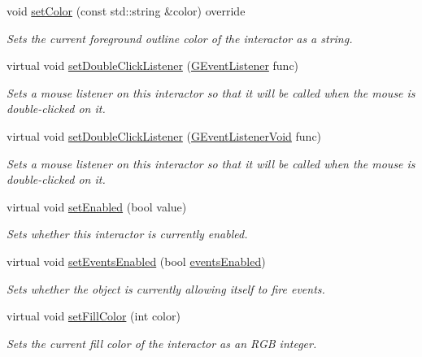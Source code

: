 \begin{DoxyCompactItemize}
void \mbox{\hyperlink{classsgl_1_1GCanvas_a56845b1accc47aa881d05939eef6996c}{set\+Color}} (const std\+::string \&color) override
\begin{DoxyCompactList}\small\item\em Sets the current foreground outline color of the interactor as a string. \end{DoxyCompactList}\item 
virtual void \mbox{\hyperlink{classsgl_1_1GInteractor_ac29f9a3462458e165fae3a1f046ee77a}{set\+Double\+Click\+Listener}} (\mbox{\hyperlink{namespacesgl_ae9f3e9eab70035da1a2b114e21357b25}{G\+Event\+Listener}} func)
\begin{DoxyCompactList}\small\item\em Sets a mouse listener on this interactor so that it will be called when the mouse is double-\/clicked on it. \end{DoxyCompactList}\item 
virtual void \mbox{\hyperlink{classsgl_1_1GInteractor_a50096194d66f48c92dd4c512d41bfc76}{set\+Double\+Click\+Listener}} (\mbox{\hyperlink{namespacesgl_a54427ce97bb1c2804e4fe2b0a62e8b17}{G\+Event\+Listener\+Void}} func)
\begin{DoxyCompactList}\small\item\em Sets a mouse listener on this interactor so that it will be called when the mouse is double-\/clicked on it. \end{DoxyCompactList}\item 
virtual void \mbox{\hyperlink{classsgl_1_1GInteractor_ab831367dd84bbd579e02e55bacb21343}{set\+Enabled}} (bool value)
\begin{DoxyCompactList}\small\item\em Sets whether this interactor is currently enabled. \end{DoxyCompactList}\item 
virtual void \mbox{\hyperlink{classsgl_1_1GObservable_afaa30b2a9e0f378fd1c70d2f1d0b8216}{set\+Events\+Enabled}} (bool \mbox{\hyperlink{classsgl_1_1GInteractor_a597a370b592e3737d38d9d2f4e2031ea}{events\+Enabled}})
\begin{DoxyCompactList}\small\item\em Sets whether the object is currently allowing itself to fire events. \end{DoxyCompactList}\item 
virtual void \mbox{\hyperlink{classsgl_1_1GDrawingSurface_a47fad447b715f2f303538434eed26709}{set\+Fill\+Color}} (int color)
\begin{DoxyCompactList}\small\item\em Sets the current fill color of the interactor as an R\+GB integer. \end{DoxyCompactList}\item 

\end{DoxyCompactItemize}
